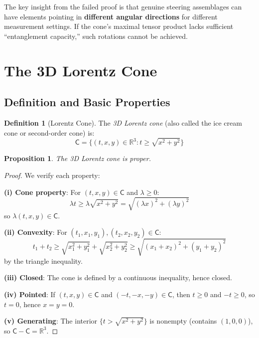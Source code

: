 \documentclass[11pt,a4paper]{article}
\newtheorem{proposition}[theorem]{Proposition}
\theoremstyle{definition}
\newtheorem{definition}[theorem]{Definition}
\newcommand{\C}{\mathsf{C}}
\newcommand{\R}{\mathbb{R}}
\begin{document}
The key insight from the failed proof is that genuine steering assemblages can have elements pointing in \textbf{different angular directions} for different measurement settings. If the cone's maximal tensor product lacks sufficient ``entanglement capacity,'' such rotations cannot be achieved.

\section{The 3D Lorentz Cone}

\subsection{Definition and Basic Properties}

\begin{definition}[Lorentz Cone]
The \emph{3D Lorentz cone} (also called the ice cream cone or second-order cone) is:
\[
\C = \{(t, x, y) \in \R^3 : t \geq \sqrt{x^2 + y^2}\}
\]
\end{definition}

\begin{proposition}\label{prop:lorentz-proper}
The 3D Lorentz cone is proper.
\end{proposition}

\begin{proof}
We verify each property:

\textbf{(i) Cone property}: For $(t,x,y) \in \C$ and $\lambda \geq 0$:
\[
\lambda t \geq \lambda \sqrt{x^2 + y^2} = \sqrt{(\lambda x)^2 + (\lambda y)^2}
\]
so $\lambda(t,x,y) \in \C$.

\textbf{(ii) Convexity}: For $(t_1, x_1, y_1), (t_2, x_2, y_2) \in \C$:
\[
t_1 + t_2 \geq \sqrt{x_1^2 + y_1^2} + \sqrt{x_2^2 + y_2^2} \geq \sqrt{(x_1+x_2)^2 + (y_1+y_2)^2}
\]
by the triangle inequality.

\textbf{(iii) Closed}: The cone is defined by a continuous inequality, hence closed.

\textbf{(iv) Pointed}: If $(t,x,y) \in \C$ and $(-t,-x,-y) \in \C$, then $t \geq 0$ and $-t \geq 0$, so $t = 0$, hence $x = y = 0$.

\textbf{(v) Generating}: The interior $\{t > \sqrt{x^2+y^2}\}$ is nonempty (contains $(1,0,0)$), so $\C - \C = \R^3$.
\end{proof}
\end{document}
